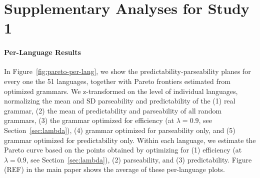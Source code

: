 \documentclass[10pt,twoside,lineno]{article}
\begin{document}
\section{Supplementary Analyses for Study 1}


\paragraph{Per-Language Results}
In Figure~\ref{fig:pareto-per-lang}, we show the predictability-parseability planes for every one the 51 languages, together with Pareto frontiers estimated from optimized grammars.
We z-transformed on the level of individual languages, normalizing the mean and SD parseability and predictability of the (1) real grammar, (2) the mean of predictability and parseability of all random grammars, (3) the grammar optimized for efficiency (at $\lambda =0.9$, see Section~\ref{sec:lambda}), (4) grammar optimized for parseability only, and (5) grammar optimized for predictability only.
Within each language, we estimate the Pareto curve based on the points obtained by optimizing for (1) efficiency (at $\lambda = 0.9$, see Section~\ref{sec:lambda}), (2) parseability, and (3) predictability.
Figure (REF) in the main paper shows the average of these per-language plots. 
\end{document}
